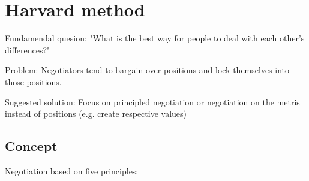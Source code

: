 \section{Harvard method}

Fundamendal quesion: "What is the best way for people to deal with each other's
differences?"

Problem: Negotiators tend to bargain over positions and lock themselves into
those positions.

Suggested solution: Focus on principled negotiation or negotiation on the
metris instead of positions (e.g. create respective values)

\subsection{Concept}
Negotiation based on five principles:
